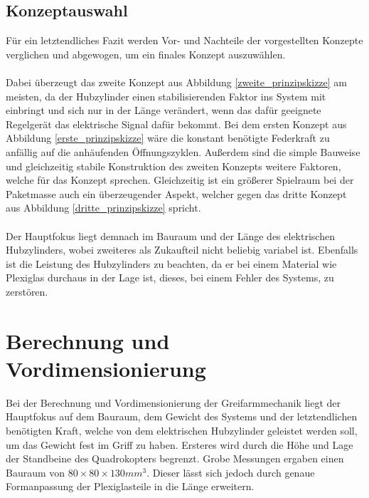 \subsection{Konzeptauswahl}
Für ein letztendliches Fazit werden Vor- und Nachteile der vorgestellten Konzepte verglichen und abgewogen, um ein finales Konzept auszuwählen.\\
\\
Dabei überzeugt das zweite Konzept aus Abbildung \ref{zweite_prinzipskizze} am meisten, da der Hubzylinder einen stabilisierenden Faktor ins System mit einbringt und sich nur in der Länge verändert, wenn das dafür geeignete Regelgerät das elektrische Signal dafür bekommt. Bei dem ersten Konzept aus Abbildung \ref{erste_prinzipskizze} wäre die konstant benötigte Federkraft zu anfällig auf die anhäufenden Öffnungszyklen. Außerdem sind die simple Bauweise und gleichzeitig stabile Konstruktion des zweiten Konzepts weitere Faktoren, welche für das Konzept sprechen. Gleichzeitig ist ein größerer Spielraum bei der Paketmasse auch ein überzeugender Aspekt, welcher gegen das dritte Konzept aus Abbildung \ref{dritte_prinzipskizze} spricht.\\
\\
Der Hauptfokus liegt demnach im Bauraum und der Länge des elektrischen Hubzylinders, wobei zweiteres als Zukaufteil nicht beliebig variabel ist. Ebenfalls ist die Leistung des Hubzylinders zu beachten, da er bei einem Material wie Plexiglas durchaus in der Lage ist, dieses, bei einem Fehler des Systems, zu zerstören.

\section{Berechnung und Vordimensionierung}
Bei der Berechnung und Vordimensionierung der Greifarmmechanik liegt der Hauptfokus auf dem Bauraum, dem Gewicht des Systems und der letztendlichen benötigten Kraft, welche von dem elektrischen Hubzylinder geleistet werden soll, um das Gewicht fest im Griff zu haben. Ersteres wird durch die Höhe und Lage der Standbeine des Quadrokopters begrenzt. Grobe Messungen ergaben einen Bauraum von  $80\times 80\times130 mm^3$. Dieser lässt sich jedoch durch genaue Formanpassung der Plexiglasteile in die Länge erweitern.

